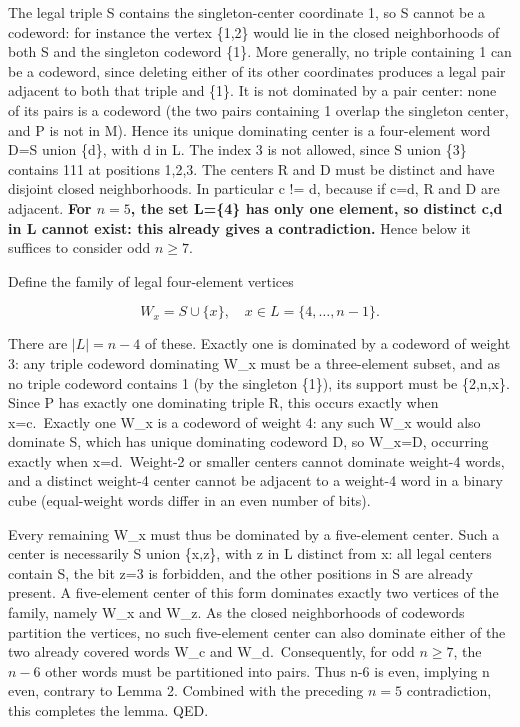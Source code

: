 \documentclass[
  11pt,
]{article}
\begin{document}
The legal triple S contains the singleton-center coordinate 1, so S
cannot be a codeword: for instance the vertex \{1,2\} would lie in the
closed neighborhoods of both S and the singleton codeword \{1\}. More
generally, no triple containing 1 can be a codeword, since deleting
either of its other coordinates produces a legal pair adjacent to both
that triple and \{1\}. It is not dominated by a pair center: none of its
pairs is a codeword (the two pairs containing 1 overlap the singleton
center, and P is not in M). Hence its unique dominating center is a
four-element word D=S union \{d\}, with d in L. The index 3 is not
allowed, since S union \{3\} contains 111 at positions 1,2,3. The
centers R and D must be distinct and have disjoint closed neighborhoods.
In particular c != d, because if c=d, R and D are adjacent. \textbf{For
\(n=5\), the set L=\{4\} has only one element, so distinct c,d in L
cannot exist: this already gives a contradiction.} Hence below it
suffices to consider odd \(n\ge 7\).

Define the family of legal four-element vertices

\[W_x=S\cup\{x\},\quad x\in L=\{4,\ldots,n-1\}.\]

There are \(|L|=n-4\) of these. Exactly one is dominated by a codeword
of weight 3: any triple codeword dominating W\_x must be a three-element
subset, and as no triple codeword contains 1 (by the singleton \{1\}),
its support must be \{2,n,x\}. Since P has exactly one dominating triple
R, this occurs exactly when x=c.~Exactly one W\_x is a codeword of
weight 4: any such W\_x would also dominate S, which has unique
dominating codeword D, so W\_x=D, occurring exactly when x=d.~Weight-2
or smaller centers cannot dominate weight-4 words, and a distinct
weight-4 center cannot be adjacent to a weight-4 word in a binary cube
(equal-weight words differ in an even number of bits).

Every remaining W\_x must thus be dominated by a five-element center.
Such a center is necessarily S union \{x,z\}, with z in L distinct from
x: all legal centers contain S, the bit z=3 is forbidden, and the other
positions in S are already present. A five-element center of this form
dominates exactly two vertices of the family, namely W\_x and W\_z. As
the closed neighborhoods of codewords partition the vertices, no such
five-element center can also dominate either of the two already covered
words W\_c and W\_d.~Consequently, for odd \(n\ge 7\), the \(n-6\) other
words must be partitioned into pairs. Thus n-6 is even, implying n even,
contrary to Lemma 2. Combined with the preceding \(n=5\) contradiction,
this completes the lemma. QED.
\end{document}
